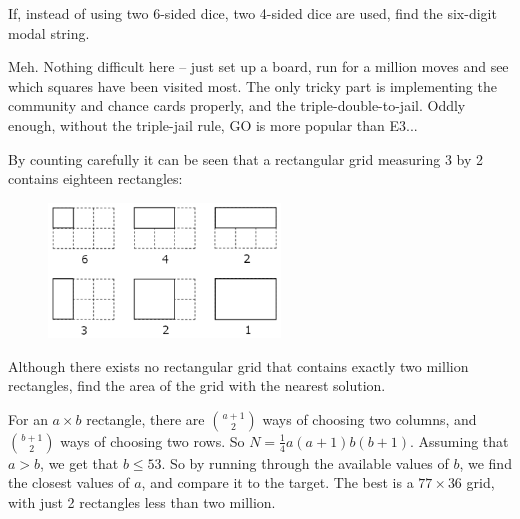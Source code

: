 If, instead of using two 6-sided dice, two 4-sided dice are used, find the six-digit modal string.


\normalsize

Meh.  Nothing difficult here -- just set up a board, run for a million moves and see which squares have been visited most.  The only tricky part is implementing the community and chance cards properly, and the triple-double-to-jail.  Oddly enough, without the triple-jail rule, GO is more popular than E3...




By counting carefully it can be seen that a rectangular grid measuring 3 by 2 contains eighteen rectangles:
\vspace{-0.5cm}
\begin{center}
\begin{figure}[h]
\centering
\includegraphics[width = 0.55\textwidth]{./images/p_085.png}
\end{figure}
\end{center}
\vspace{-1.2cm}
Although there exists no rectangular grid that contains exactly two million rectangles, find the area of the grid with the nearest solution.

For an $a\times b$ rectangle, there are $\binom {a+1}2$ ways of choosing two columns, and $\binom {b+1}2$ ways of choosing
two rows.  So $N = \tfrac 14 a(a+1)b(b+1)$.  Assuming that $a > b$, we get that $b \leq 53$.  So by running through the available values of $b$, we find the closest values of $a$, and compare it to the target.  The best is a $77\times 36$ grid,
with just 2 rectangles less than two million.




